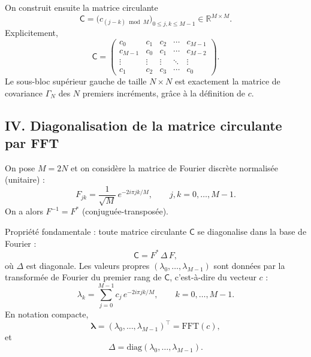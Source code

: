 \documentclass[11pt,a4paper]{article}
\newcommand{\R}{\mathbb{R}}
\newcommand{\1}{\mathbf{1}}
\begin{document}
On construit ensuite la matrice circulante
\begin{equation}
  \mathsf{C} =
  \bigl(c_{(j-k)\bmod M}\bigr)_{0\le j,k\le M-1}
  \in\R^{M\times M}.
\end{equation}
Explicitement,
\[
  \mathsf{C} =
  \begin{pmatrix}
    c_0   & c_1   & c_2   & \cdots & c_{M-1} \\
    c_{M-1} & c_0 & c_1   & \cdots & c_{M-2} \\
    \vdots  & \vdots & \vdots & \ddots & \vdots \\
    c_1  & c_2  & c_3  & \cdots & c_0
  \end{pmatrix}.
\]
Le sous-bloc supérieur gauche de taille $N\times N$ est
exactement la matrice de covariance $\Gamma_N$ des $N$
premiers incréments, grâce à la définition de $c$.

\subsection*{IV. Diagonalisation de la matrice circulante par FFT}

On pose $M=2N$ et on considère la matrice de Fourier discrète
normalisée (unitaire) :
\begin{equation}
  F_{jk}
  = \frac{1}{\sqrt{M}}\,
    e^{-2i\pi jk / M},
  \qquad j,k=0,\dots,M-1.
\end{equation}
On a alors $F^{-1} = F^{\ast}$ (conjuguée-transposée).

Propriété fondamentale : toute matrice circulante $\mathsf{C}$ se
diagonalise dans la base de Fourier :
\begin{equation}
  \mathsf{C}
  = F^{\ast}\,\Delta\,F,
\end{equation}
où $\Delta$ est diagonale. Les valeurs propres
$(\lambda_0,\dots,\lambda_{M-1})$ sont données par la transformée
de Fourier du premier rang de $\mathsf{C}$, c'est-à-dire
du vecteur $c$ :
\begin{equation}
  \lambda_k
  = \sum_{j=0}^{M-1}
      c_j\,e^{-2i\pi jk / M},
  \qquad k=0,\dots,M-1.
\end{equation}
En notation compacte,
\begin{equation}
  \bm{\lambda}
  =
  (\lambda_0,\dots,\lambda_{M-1})^\top
  = \mathrm{FFT}(c),
\end{equation}
et
\begin{equation}
  \Delta = \mathrm{diag}(\lambda_0,\dots,\lambda_{M-1}).
\end{equation}
\end{document}
